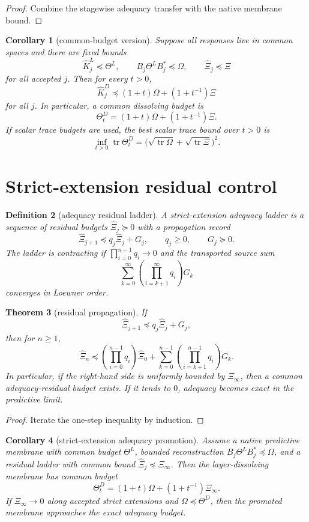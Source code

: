 \documentclass[11pt]{article}
\newtheorem{theorem}{Theorem}[section]
\newtheorem{definition}[theorem]{Definition}
\newtheorem{corollary}[theorem]{Corollary}
\newcommand{\tr}{\operatorname{tr}}
\begin{document}
\begin{proof}
Combine the stagewise adequacy transfer with the native membrane bound.
\end{proof}

\begin{corollary}[common-budget version]
Suppose all responses live in common spaces and there are fixed bounds
\[
  \widehat K^L_j\preceq\Theta^L,
  \qquad
  B_j\Theta^LB_j^*\preceq\Omega,
  \qquad
  \widehat\Xi_j\preceq\Xi
\]
for all accepted $j$. Then for every $t>0$,
\[
  \widehat K^D_j\preceq (1+t)\Omega+(1+t^{-1})\Xi
\]
for all $j$. In particular, a common dissolving budget is
\[
  \Theta^D_t=(1+t)\Omega+(1+t^{-1})\Xi.
\]
If scalar trace budgets are used, the best scalar trace bound over $t>0$ is
\[
  \inf_{t>0}\tr\Theta^D_t
  =\bigl(\sqrt{\tr\Omega}+\sqrt{\tr\Xi}\bigr)^2.
\]
\end{corollary}

\section{Strict-extension residual control}

\begin{definition}[adequacy residual ladder]
A strict-extension adequacy ladder is a sequence of residual budgets $\widehat\Xi_j\succeq0$ with a propagation record
\[
  \widehat\Xi_{j+1}\preceq q_j\widehat\Xi_j+G_j,
  \qquad q_j\ge0,
  \qquad G_j\succeq0.
\]
The ladder is contracting if $\prod_{i=0}^{n-1}q_i\to0$ and the transported source sum
\[
  \sum_{k=0}^{\infty}\left(\prod_{i=k+1}^{\infty}q_i\right)G_k
\]
converges in Loewner order.
\end{definition}

\begin{theorem}[residual propagation]
If
\[
  \widehat\Xi_{j+1}\preceq q_j\widehat\Xi_j+G_j,
\]
then for $n\ge1$,
\[
  \widehat\Xi_n
  \preceq
  \left(\prod_{i=0}^{n-1}q_i\right)\widehat\Xi_0
  +
  \sum_{k=0}^{n-1}\left(\prod_{i=k+1}^{n-1}q_i\right)G_k.
\]
In particular, if the right-hand side is uniformly bounded by $\Xi_\infty$, then a common adequacy-residual budget exists. If it tends to $0$, adequacy becomes exact in the predictive limit.
\end{theorem}

\begin{proof}
Iterate the one-step inequality by induction.
\end{proof}

\begin{corollary}[strict-extension adequacy promotion]
Assume a native predictive membrane with common budget $\Theta^L$, bounded reconstruction $B_j\Theta^L B_j^*\preceq\Omega$, and a residual ladder with common bound $\widehat\Xi_j\preceq\Xi_\infty$. Then the layer-dissolving membrane has common budget
\[
  \Theta^D_t=(1+t)\Omega+(1+t^{-1})\Xi_\infty.
\]
If $\Xi_\infty\to0$ along accepted strict extensions and $\Omega\preceq\Theta^D$, then the promoted membrane approaches the exact adequacy budget.
\end{corollary}
\end{document}
